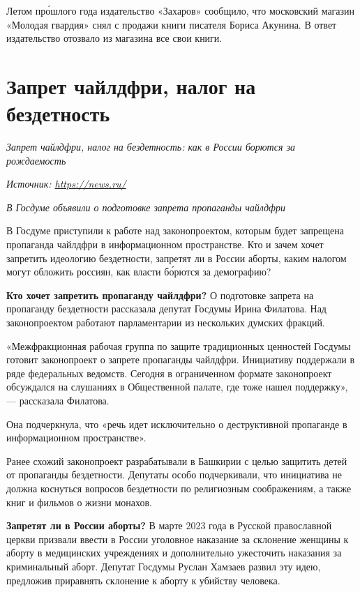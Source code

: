 Летом пр\'{о}шлого года издательство «Захаров» сообщило,
что московский магазин «Молодая гвардия» снял с продажи
книги писателя Бориса Акунина.
В ответ издательство отозвало из магазина все свои книги.


\newpage
\section{Запрет чайлдфри, налог на бездетность}

\textit{Запрет чайлдфри, налог на бездетность: как в России борются за рождаемость}

\textit{Источник: \url{https://news.ru/}}

\textit{В Госдуме объявили о подготовке запрета пропаганды чайлдфри}

В Госдуме приступили к работе над законопроектом,
которым будет запрещена пропаганда чайлдфри в информационном
пространстве.
Кто и зачем хочет запретить идеологию бездетности,
запретят ли в России аборты,
каким налогом могут обложить россиян,
как власти б\'{о}рются за демографию?

\textbf{Кто хочет запретить пропаганду чайлдфри?}
О подготовке запрета на пропаганду бездетности рассказала
депутат Госдумы Ирина Филатова.
Над законопроектом работают парламентарии из нескольких
думских фракций.

«Межфракционная рабочая группа по защите традиционных ценностей
Госдумы готовит законопроект о запрете пропаганды чайлдфри.
Инициативу поддержали в ряде федеральных ведомств.
Сегодня в ограниченном формате законопроект обсуждался
на слушаниях в Общественной палате, где тоже нашел поддержку»,
--- рассказала Филатова.

Она подчеркнула, что «речь идет исключительно о деструктивной
пропаганде в информационном пространстве».

Ранее схожий законопроект разрабатывали в Башкирии с целью
защитить детей от пропаганды бездетности.
Депутаты особо подчеркивали, что инициатива не должна коснуться
вопросов бездетности по религиозным соображениям, а также книг
и фильмов о жизни монахов.

\textbf{Запретят ли в России аборты?} В марте 2023 года в Русской
православной церкви призвали ввести в России уголовное наказание
за склонение женщины к аборту в медицинских учреждениях и дополнительно
ужесточить наказания за криминальный аборт.
Депутат Госдумы Руслан Хамзаев развил эту идею,
предложив приравнять склонение к аборту к убийству человека.

